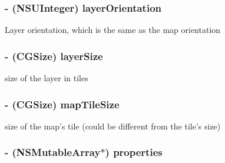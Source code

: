 \hypertarget{interface_c_c_t_m_x_layer_ab1be7f739da6da05fbc11da0e2c647f9}{
\subsubsection[{layer\-Orientation}]{\setlength{\rightskip}{0pt plus 5cm}-\/ (N\-S\-U\-Integer) {\bf layer\-Orientation}}}\label{interface_c_c_t_m_x_layer_ab1be7f739da6da05fbc11da0e2c647f9}
Layer orientation, which is the same as the map orientation \hypertarget{interface_c_c_t_m_x_layer_a4d680b868f0e476d8a51e52d3c4ff64e}{
\subsubsection[{layer\-Size}]{\setlength{\rightskip}{0pt plus 5cm}-\/ (C\-G\-Size) {\bf layer\-Size}}}\label{interface_c_c_t_m_x_layer_a4d680b868f0e476d8a51e52d3c4ff64e}
size of the layer in tiles \hypertarget{interface_c_c_t_m_x_layer_a13536a56d5a74341e766d8918a2c9013}{
\subsubsection[{map\-Tile\-Size}]{\setlength{\rightskip}{0pt plus 5cm}-\/ (C\-G\-Size) {\bf map\-Tile\-Size}}}\label{interface_c_c_t_m_x_layer_a13536a56d5a74341e766d8918a2c9013}
size of the map's tile (could be different from the tile's size) \hypertarget{interface_c_c_t_m_x_layer_a3fcc631e6c87920daa231095c62b3344}{
\subsubsection[{properties}]{\setlength{\rightskip}{0pt plus 5cm}-\/ (N\-S\-Mutable\-Array$\ast$) {\bf properties}}}\label{interface_c_c_t_m_x_layer_a3fcc631e6c87920daa231095c62b3344}
